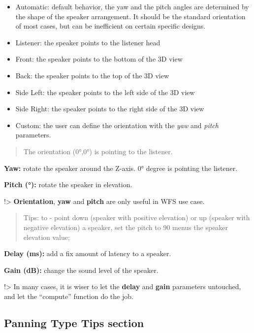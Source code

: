 \documentclass[
  letterpaper,
  DIV=11,
  numbers=noendperiod]{scrreport}
\providecommand{\tightlist}{%
  \setlength{\itemsep}{0pt}\setlength{\parskip}{0pt}}\usepackage{longtable,booktabs,array}
\begin{document}
\begin{itemize}
\tightlist
\item
  Automatic: default behavior, the yaw and the pitch angles are
  determined by the shape of the speaker arrangement. It should be the
  standard orientation of most cases, but can be inefficient on certain
  specific designs.
\item
  Listener: the speaker points to the listener head
\item
  Front: the speaker points to the bottom of the 3D view
\item
  Back: the speaker points to the top of the 3D view
\item
  Side Left: the speaker points to the left side of the 3D view
\item
  Side Right: the speaker points to the right side of the 3D view
\item
  Custom: the user can define the orientation with the \emph{yaw} and
  \emph{pitch} parameters.
\end{itemize}

\begin{quote}
The orientation (0°,0°) is pointing to the listener.
\end{quote}

\textbf{Yaw:} rotate the speaker around the Z-axis. 0° degree is
pointing the listener.

\textbf{Pitch (°):} rotate the speaker in elevation.

!\textgreater{} \textbf{Orientation}, \textbf{yaw} and \textbf{pitch}
are only useful in WFS use case.

\begin{quote}
Tips: to - point down (speaker with positive elevation) or up (speaker
with negative elevation) a speaker, set the pitch to 90 menus the
speaker elevation value;
\end{quote}

\textbf{Delay (ms):} add a fix amount of latency to a speaker.

\textbf{Gain (dB):} change the sound level of the speaker.

!\textgreater{} In many cases, it is wiser to let the \textbf{delay} and
\textbf{gain} parameters untouched, and let the ``compute'' function do
the job.

\hypertarget{panning-type-tips-section}{%
\subsection{Panning Type Tips section}\label{panning-type-tips-section}}
\end{document}
